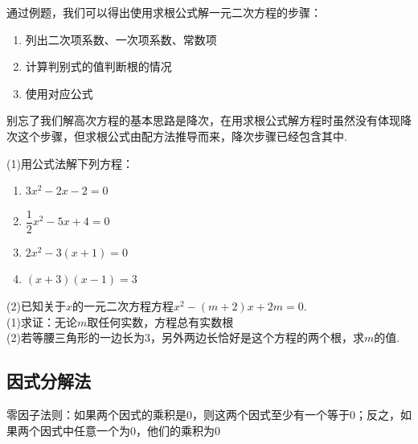 \documentclass[lang=cn, 10pt, titlestyle=display, oneside]{elegantbook}
\begin{document}
通过例题，我们可以得出使用求根公式解一元二次方程的步骤：
\begin{enumerate}
    \item 列出二次项系数、一次项系数、常数项
    \item 计算判别式的值判断根的情况
    \item 使用对应公式
\end{enumerate}
\par
别忘了我们解高次方程的基本思路是降次，在用求根公式解方程时虽然没有体现降次这个步骤，但求根公式由配方法推导而来，降次步骤已经包含其中.
\begin{exercise}
\setlength{\parindent}{0pt} %
\setlength{\columnseprule}{0.01pt}
\begin{multicols}{2}
    (1)用公式法解下列方程：
    \begin{enumerate}
        \item \(3x^2-2x-2=0\)
        \item \(\dfrac{1}{2}x^2-5x+4=0\)
        \item \(2x^2-3(x+1)=0\)
        \item \((x+3)(x-1)=3\)
    \end{enumerate}
    (2)已知关于\(x\)的一元二次方程方程\(x^2-(m+2)x+2m=0\).\\
    (1)求证：无论\(m\)取任何实数，方程总有实数根\\
    (2)若等腰三角形的一边长为3，另外两边长恰好是这个方程的两个根，求\(m\)的值.
\end{multicols}
\end{exercise}

\subsection{因式分解法}

\begin{property}
    零因子法则：如果两个因式的乘积是0，则这两个因式至少有一个等于0；反之，如果两个因式中任意一个为0，他们的乘积为0
\end{property}
\end{document}
